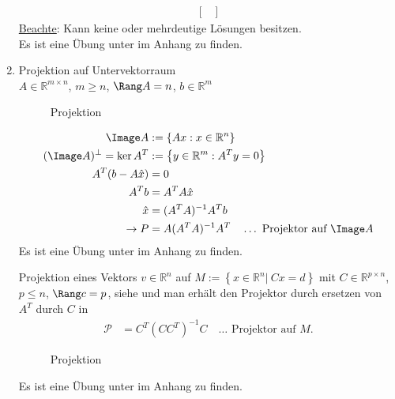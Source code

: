 \begin{enumerate}[label=(\arabic*)]
\begin{align*}
\begin{bmatrix}
  \end{bmatrix}
  \end{align*}
  \underline{Beachte}: Kann keine oder mehrdeutige Lösungen besitzen.\\
  Es ist eine Übung unter  im Anhang zu finden.
  \item Projektion auf Untervektorraum\\
  		$A\in\mathbb{R}^{m\times n}$, $m\ge n$, $\Rang A=n$, $b\in\mathbb{R}^m$\\
  		\begin{figure}[!htb]
			\centering
			
			\caption{Projektion}
			\label{fig:kap_1_projektion}
		\end{figure}
  		\begin{align}
  			\Image A & := \left\{Ax:x\in\mathbb{R}^n \right\} \notag\\
  			(\Image A)^{\bot} =\ker A^T & := \left\{y\in\mathbb{R}^m:A^Ty=0 \right\}\notag\\
  			A^T(b-A\hat{x}) & = 0\notag\\
  			A^Tb & = A^TA\hat{x}\notag\\
  			\hat{x} & = (A^TA)^{-1}A^Tb\notag\\ 
  			\rightarrow P & = A(A^TA)^{-1}A^T\quad \ldots\text{ Projektor auf $\Image A$} \label{eq:kap_1_projektion}
  		\end{align}
  		Es ist eine Übung unter  im Anhang zu finden.
  		
  		Projektion eines Vektors $v\in\mathbb{R}^n$ auf $M:=\left\{x\in\mathbb{R}^n|\ Cx=d \right\}$ mit $C\in\mathbb{R}^{p\times n}$, $p\le n$, $\Rang c = p$, siehe
  		 und man erhält den Projektor durch ersetzen von $A^T$ durch $C$ in 
  		\begin{align*}
  			\mathcal{P} & = C^T(CC^T)^{-1}C\quad \ldots\text{ Projektor auf $M$}. 
  		\end{align*}
  		\begin{figure}[!htb]
			\centering
			
			\caption{Projektion}
			\label{fig:kap_1_projektion}
		\end{figure}
  		Es ist eine Übung unter  im Anhang zu finden.
\end{enumerate}

